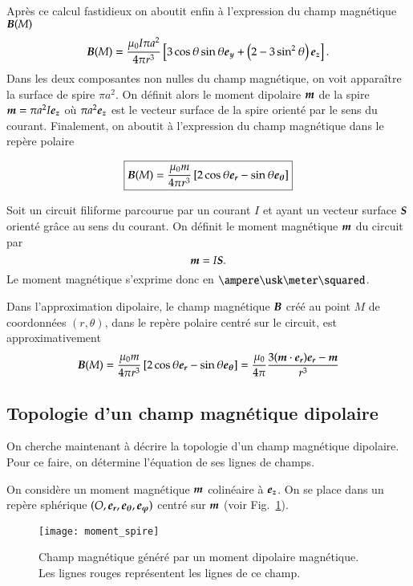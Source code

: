 	Après ce calcul fastidieux on aboutit enfin à l'expression du champ magnétique
	$\vecb(M)$
		\begin{equation*}
			\vecb(M) = \dfrac{\mu_0 I \pi a^2}{4 \pi r^3}
			\left[3\cos\theta\sin\theta\ey + \left(2 - 3 \sin^2\theta\right)\ez
			\right].
		\end{equation*}
	Dans les deux composantes non nulles du champ magnétique, on voit apparaître
	la surface de spire $\pi a ^2$. On définit alors le moment dipolaire $\vecm$
	de la spire $\vecm = \pi a^2 I \ez$ où $\pi a^2 \ez$ est le vecteur surface de la 
	spire orienté par le sens du courant. Finalement, on aboutit à l'expression du champ
	magnétique dans le repère polaire

		\begin{equation}
			\boxed{\vecb(M) = \dfrac{\mu_0 m}{4 \pi r^3} 
			\left[2\cos\theta\er - \sin \theta\etheta\right]}
		\end{equation}

	\begin{defn}
		Soit un circuit filiforme parcourue par un courant $I$ et ayant 
		un vecteur surface $\vecs$ orienté grâce au sens du courant. On 
		définit le moment magnétique $\vecm$ du circuit par
		\begin{equation*}
			\vecm = I\vecs.
		\end{equation*}
		Le moment magnétique s'exprime donc en $\ampere \usk
		\meter \squared$.

		Dans l'approximation dipolaire, le champ magnétique $\vecb$ créé au point
		$M$ de coordonnées $(r, \theta)$, dans le repère polaire centré 
		sur le circuit, est approximativement
		\begin{equation*}
			\vecb(M) = \dfrac{\mu_0 m}{4 \pi r^3} 
			\left[2\cos\theta\er - \sin\theta\etheta\right]
			= \dfrac{\mu_0}{4 \pi} \dfrac{3(\vecm \cdot \er)\er - \vecm}
			{r^3}
		\end{equation*}
	\end{defn}
	
	\subsection{Topologie d'un champ magnétique dipolaire}
	On cherche maintenant à décrire la topologie d'un champ magnétique
	dipolaire. Pour ce faire, on détermine l'équation de ses lignes de champs.

	On considère un moment magnétique $\vecm$ colinéaire à $\ez$. On se place
	dans un repère sphérique $(O, \er, \etheta, \ephi)$ centré sur $\vecm$ 
	(voir Fig.~\ref{fig:aimant_moment_spire}). 
	\begin{figure}[htpb]
		\centering
		\texttt{[image: moment\_spire]}
		\caption{Champ magnétique généré par un moment dipolaire 
		magnétique. Les lignes rouges représentent les lignes de ce 
		champ.}%
		\label{fig:aimant_moment_spire}
	\end{figure}
	

